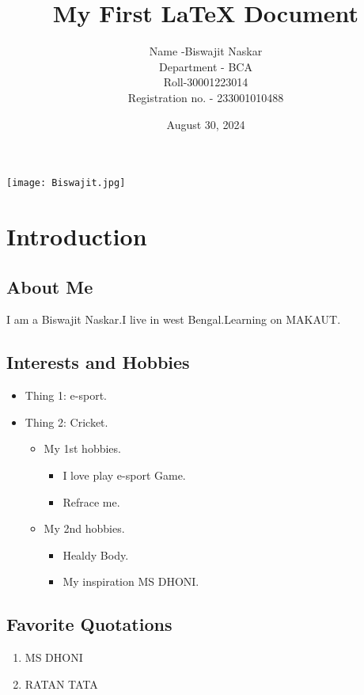 \documentclass{article}
\begin{document}
\title{My First LaTeX Document}
\author{Name -Biswajit Naskar \\
Department - BCA \\
Roll-30001223014 \\
Registration no. - 233001010488}
\date{August 30, 2024}

\maketitle

\begin{center}
\texttt{[image: Biswajit.jpg]}
\end{center}

\section{Introduction}
\subsection{About Me}
I am a Biswajit Naskar.I live in west Bengal.Learning on MAKAUT.

\subsection{Interests and Hobbies}
\begin{itemize}
\item Thing 1: e-sport.
\item Thing 2: Cricket.
    \begin{itemize}
    \item My 1st hobbies.
        \begin{itemize}
        \item I love play e-sport Game.
        \item Refrace me.
        \end{itemize}
    \item My 2nd hobbies.
        \begin{itemize}
        \item Healdy Body.
        \item My inspiration MS DHONI.
        \end{itemize}
    \end{itemize}
\end{itemize}

\subsection{Favorite Quotations}
\begin{enumerate}
\item MS DHONI
\item RATAN TATA
\end{enumerate}
\end{document}
